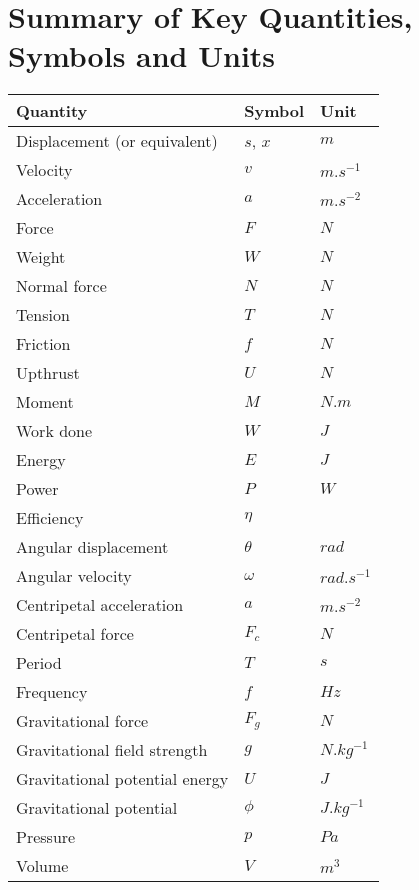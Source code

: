 \documentclass[12pt,a4 paper]{article}
\renewcommand*{\arraystretch}{1.5}
\begin{document}


\section{Summary of Key Quantities, Symbols and Units}
\renewcommand*{\arraystretch}{1.4}
\begin{longtable}[H]{p{} p{} p{}}
\toprule
\textbf{Quantity} & \textbf{Symbol} & \textbf{Unit} \\
\midrule
\endhead
Displacement (or equivalent) & $s$, $x$ & $\unit{m}$ \\*
Velocity & $v$ & $\unit{m.s^{-1}}$ \\*
Acceleration & $a$ & $\unit{m.s^{-2}}$ \\*
\midrule
Force & $F$ & $\unit{N}$ \\*
Weight & $W$ & $\unit{N}$ \\*
Normal force & $N$ & $\unit{N}$ \\*
Tension & $T$ & $\unit{N}$ \\*
Friction & $f$ & $\unit{N}$ \\*
Upthrust & $U$ & $\unit{N}$ \\*
Moment & $M$ & $\unit{N.m}$ \\*
Work done & $W$ & $\unit{J}$ \\*
Energy & $E$ & $\unit{J}$ \\*
Power & $P$ & $\unit{W}$ \\*
Efficiency & $\eta$ & \\*
\midrule
Angular displacement & $\theta$ & $\unit{rad}$ \\*
Angular velocity & $\omega$ & $\unit{rad.s^{-1}}$ \\*
Centripetal acceleration & $a$ & $\unit{m.s^{-2}}$ \\*
Centripetal force & $F_c$ & $\unit{N}$ \\*
Period & $T$ & $\unit{s}$ \\*
Frequency & $f$ & $\unit{Hz}$ \\*
\midrule
Gravitational force & $F_g$ & $\unit{N}$ \\*
Gravitational field strength & $g$ & $\unit{N.kg^{-1}}$ \\*
Gravitational potential energy & $U$ & $\unit{J}$ \\*
Gravitational potential & $\phi$ & $\unit{J.kg^{-1}}$ \\*
\midrule
Pressure & $p$ & $\unit{Pa}$ \\*
Volume & $V$ & $\unit{m^3}$ \\*

\end{longtable}
\end{document}
